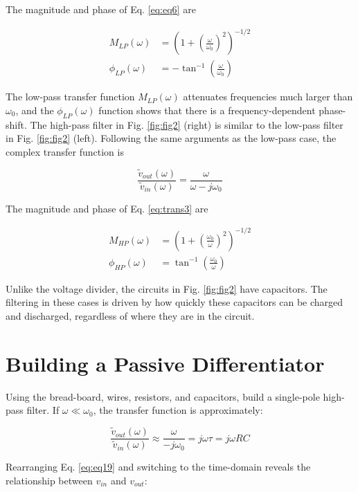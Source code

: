 \documentclass[12pt]{article}
\begin{document}
The magnitude and phase of Eq. \ref{eq:eq6} are

\begin{align}
M_{LP}(\omega) &= \left( 1 + \left( \frac{\omega}{\omega_0}\right)^2 \right)^{-1/2} \\
\phi_{LP}(\omega) &= -\tan^{-1}\left(\frac{\omega}{\omega_0}\right)
\label{eq:eq7}
\end{align}

The low-pass transfer function $M_{LP}(\omega)$ attenuates frequencies much larger than $\omega_0$, and the $\phi_{LP}(\omega)$ function shows that there is a frequency-dependent phase-shift.  The high-pass filter in Fig. \ref{fig:fig2} (right) is similar to the low-pass filter in Fig. \ref{fig:fig2} (left).  Following the same arguments as the low-pass case, the complex transfer function is

\begin{equation}
\frac{\tilde{v}_{out}(\omega)}{\tilde{v}_{in}(\omega)} = \frac{\omega}{\omega - j\omega_0}
\label{eq:trans3}
\end{equation}

The magnitude and phase of Eq. \ref{eq:trans3} are

\begin{align}
M_{HP}(\omega) &= \left( 1 + \left( \frac{\omega_0}{\omega}\right)^2 \right)^{-1/2} \\
\phi_{HP}(\omega) &= \tan^{-1}\left(\frac{\omega_0}{\omega}\right)
\end{align}

Unlike the voltage divider, the circuits in Fig. \ref{fig:fig2} have capacitors.  The filtering in these cases is driven by how quickly these capacitors can be charged and discharged, regardless of where they are in the circuit.

\section{Building a Passive Differentiator}

Using the bread-board, wires, resistors, and capacitors, build a single-pole high-pass filter.  If $\omega \ll \omega_0$, the transfer function is approximately:

\begin{equation}
\frac{\tilde{v}_{out}(\omega)}{\tilde{v}_{in}(\omega)} \approx \frac{\omega}{-j\omega_0} = j\omega \tau = j\omega RC
\label{eq:eq19}
\end{equation}

Rearranging Eq. \ref{eq:eq19} and switching to the time-domain reveals the relationship between $v_{in}$ and $v_{out}$:
\end{document}
